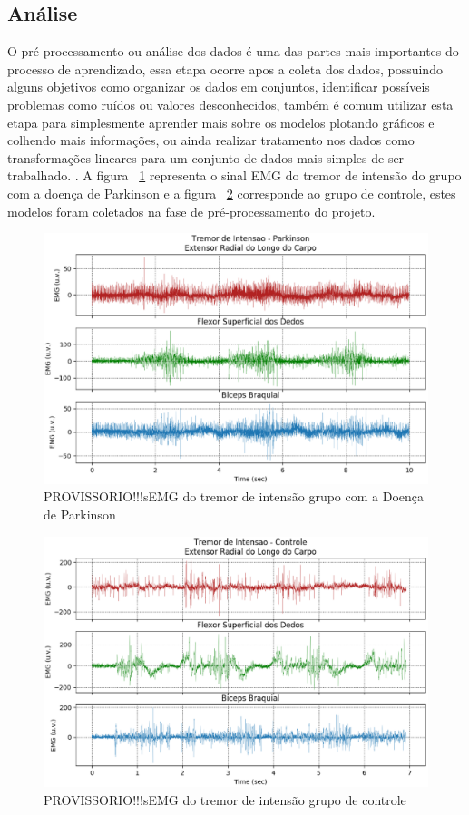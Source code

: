 \subsection{Análise}
O pré-processamento ou análise dos dados é uma das partes mais importantes do processo de aprendizado, essa etapa ocorre apos a coleta dos dados, possuindo alguns objetivos como organizar os dados em conjuntos, identificar possíveis problemas como ruídos ou valores desconhecidos, também é comum utilizar esta etapa para simplesmente aprender mais sobre os modelos plotando gráficos e colhendo mais informações, ou ainda realizar tratamento nos dados como transformações lineares para um conjunto de dados mais simples de ser trabalhado. \cite{batista2003pre}. A figura ~\ref{tremor_i_parkinson} representa o sinal EMG do tremor de intensão do grupo com a doença de Parkinson e a figura ~\ref{tremor_intensao} corresponde ao grupo de controle, estes modelos foram coletados na fase de pré-processamento do projeto.


\begin{figure}[!htb]
   \centering
    \includegraphics[width=1\textwidth]{figuras/tremor_i_parkinson.eps}
    \caption{PROVISSORIO!!!sEMG do tremor de intensão grupo com a Doença de Parkinson}
    \label{tremor_i_parkinson}
\end{figure}

\begin{figure}[!htb]
   \centering
    \includegraphics[width=1\textwidth]{figuras/tremor_intensao.eps}
    \caption{PROVISSORIO!!!sEMG do tremor de intensão grupo de controle}
    \label{tremor_intensao}
\end{figure}

